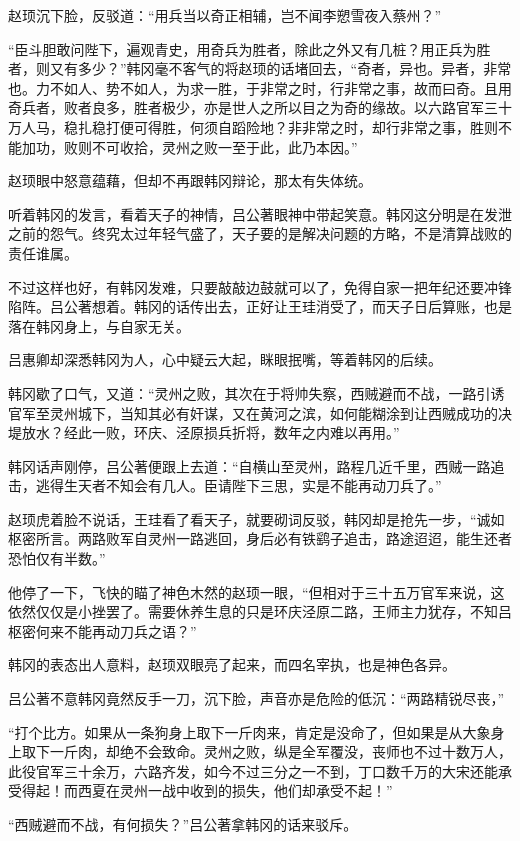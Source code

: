 赵顼沉下脸，反驳道：“用兵当以奇正相辅，岂不闻李愬雪夜入蔡州？”

“臣斗胆敢问陛下，遍观青史，用奇兵为胜者，除此之外又有几桩？用正兵为胜者，则又有多少？”韩冈毫不客气的将赵顼的话堵回去，“奇者，异也。异者，非常也。力不如人、势不如人，为求一胜，于非常之时，行非常之事，故而曰奇。且用奇兵者，败者良多，胜者极少，亦是世人之所以目之为奇的缘故。以六路官军三十万人马，稳扎稳打便可得胜，何须自蹈险地？非非常之时，却行非常之事，胜则不能加功，败则不可收拾，灵州之败一至于此，此乃本因。”

赵顼眼中怒意蕴藉，但却不再跟韩冈辩论，那太有失体统。

听着韩冈的发言，看着天子的神情，吕公著眼神中带起笑意。韩冈这分明是在发泄之前的怨气。终究太过年轻气盛了，天子要的是解决问题的方略，不是清算战败的责任谁属。

不过这样也好，有韩冈发难，只要敲敲边鼓就可以了，免得自家一把年纪还要冲锋陷阵。吕公著想着。韩冈的话传出去，正好让王珪消受了，而天子日后算账，也是落在韩冈身上，与自家无关。

吕惠卿却深悉韩冈为人，心中疑云大起，眯眼抿嘴，等着韩冈的后续。

韩冈歇了口气，又道：“灵州之败，其次在于将帅失察，西贼避而不战，一路引诱官军至灵州城下，当知其必有奸谋，又在黄河之滨，如何能糊涂到让西贼成功的决堤放水？经此一败，环庆、泾原损兵折将，数年之内难以再用。”

韩冈话声刚停，吕公著便跟上去道：“自横山至灵州，路程几近千里，西贼一路追击，逃得生天者不知会有几人。臣请陛下三思，实是不能再动刀兵了。”

赵顼虎着脸不说话，王珪看了看天子，就要砌词反驳，韩冈却是抢先一步，“诚如枢密所言。两路败军自灵州一路逃回，身后必有铁鹞子追击，路途迢迢，能生还者恐怕仅有半数。”

他停了一下，飞快的瞄了神色木然的赵顼一眼，“但相对于三十五万官军来说，这依然仅仅是小挫罢了。需要休养生息的只是环庆泾原二路，王师主力犹存，不知吕枢密何来不能再动刀兵之语？”

韩冈的表态出人意料，赵顼双眼亮了起来，而四名宰执，也是神色各异。

吕公著不意韩冈竟然反手一刀，沉下脸，声音亦是危险的低沉：“两路精锐尽丧，”

“打个比方。如果从一条狗身上取下一斤肉来，肯定是没命了，但如果是从大象身上取下一斤肉，却绝不会致命。灵州之败，纵是全军覆没，丧师也不过十数万人，此役官军三十余万，六路齐发，如今不过三分之一不到，丁口数千万的大宋还能承受得起！而西夏在灵州一战中收到的损失，他们却承受不起！”

“西贼避而不战，有何损失？”吕公著拿韩冈的话来驳斥。

